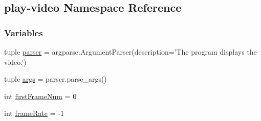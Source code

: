 \hypertarget{namespaceplay-video}{\subsection{play-\/video Namespace Reference}
\label{namespaceplay-video}
}
\subsubsection*{Variables}
\begin{DoxyCompactItemize}
\item 
tuple \hyperlink{namespaceplay-video_a96130bca428a51e38a074bd472f58345}{parser} = argparse.\-Argument\-Parser(description='The program displays the video.')
\item 
tuple \hyperlink{namespaceplay-video_a3d22c1d9d5993f4571eda1a381b008ce}{args} = parser.\-parse\-\_\-args()
\item 
int \hyperlink{namespaceplay-video_a02736d75444e0d9051079c55cd648d58}{first\-Frame\-Num} = 0
\item 
int \hyperlink{namespaceplay-video_ae12c2e1c8988e73e97b2d64060e8a853}{frame\-Rate} = -\/1
\end{DoxyCompactItemize}


